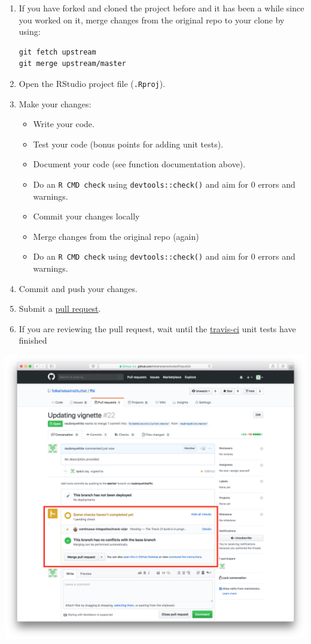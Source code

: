 \documentclass[12pt,]{article}
\providecommand{\tightlist}{%
  \setlength{\itemsep}{0pt}\setlength{\parskip}{0pt}}
\begin{document}
\begin{enumerate}
\def\labelenumi{\arabic{enumi}.}
\item
  If you have forked and cloned the project before and it has been a
  while since you worked on it, merge changes from the original repo to
  your clone by using:

\begin{verbatim}
git fetch upstream
git merge upstream/master
\end{verbatim}
\item
  Open the RStudio project file (\texttt{.Rproj}).
\item
  Make your changes:

  \begin{itemize}
  \tightlist
  \item
    Write your code.
  \item
    Test your code (bonus points for adding unit tests).
  \item
    Document your code (see function documentation above).
  \item
    Do an \texttt{R\ CMD\ check} using \texttt{devtools::check()} and
    aim for 0 errors and warnings.
  \item
    Commit your changes locally
  \item
    Merge changes from the original repo (again)
  \item
    Do an \texttt{R\ CMD\ check} using \texttt{devtools::check()} and
    aim for 0 errors and warnings.
  \end{itemize}
\item
  Commit and push your changes.
\item
  Submit a
  \href{https://guides.github.com/activities/forking/\#making-a-pull-request}{pull
  request}.
\item
  If you are reviewing the pull request, wait until the
  \href{www.travis-ci.org}{travis-ci} unit tests have finished
\end{enumerate}

\includegraphics{images/pull_request_before_checks.png}
\end{document}
